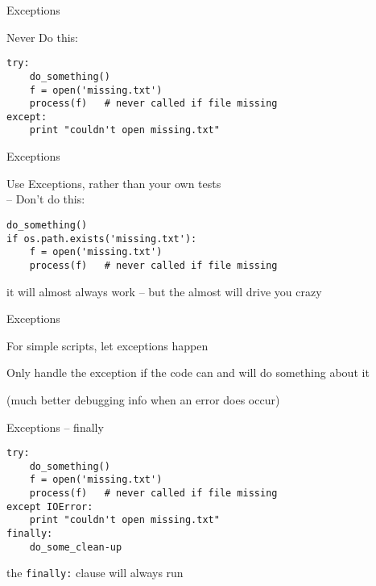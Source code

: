 \documentclass{beamer}
\begin{document}
\begin{frame}[fragile]{Exceptions}

{\Large Never Do this:}
\vfill
\begin{verbatim}
try:
    do_something()
    f = open('missing.txt')
    process(f)   # never called if file missing
except:
    print "couldn't open missing.txt"
\end{verbatim}
\vfill
\end{frame}

\begin{frame}[fragile]{Exceptions}

{\Large Use Exceptions, rather than your own tests\\
 -- Don't do this:}
\vfill
\begin{verbatim}
do_something()
if os.path.exists('missing.txt'):
    f = open('missing.txt')
    process(f)   # never called if file missing
\end{verbatim}
\vfill
it will almost always work -- but the almost will drive you crazy
\end{frame}

\begin{frame}[fragile]{Exceptions}

{\centering

{\Large "easier to ask forgiveness than permission"
\vfill
\hfill -- Grace Hopper
}

\vfill
\url{http://www.youtube.com/watch?v=AZDWveIdqjY}
\end{frame}

\begin{frame}[fragile]{Exceptions}

\vfill
{\Large 
For simple scripts, let exceptions happen\\
\vfill

Only handle the exception if the code can and will do something about it
}
\vfill
(much better debugging info when an error does occur)
\end{frame}


\begin{frame}[fragile]{Exceptions -- finally }

\vfill
\begin{verbatim}
try:
    do_something()
    f = open('missing.txt')
    process(f)   # never called if file missing
except IOError:
    print "couldn't open missing.txt"
finally:
    do_some_clean-up
\end{verbatim}
\vfill
{\Large the \verb|finally:| clause will always run}
\end{frame}
\end{document}
